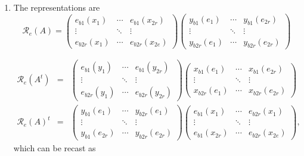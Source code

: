 \documentclass[aps,preprint]{revtex4}
\begin{document}
\begin{enumerate}
\item The representations are 
\begin{equation}
\mathcal{R}_{e}\left( A\right) =\left( 
\begin{array}{ccc}
e_{b1}\left( x_{1}\right) & \cdots & e_{b1}\left( x_{2r}\right) \\ 
\vdots & \ddots & \vdots \\ 
e_{b2r}\left( x_{1}\right) & \cdots & e_{b2r}\left( x_{2e}\right)%
\end{array}%
\right) \left( 
\begin{array}{ccc}
y_{b1}\left( e_{1}\right) & \cdots & y_{b1}\left( e_{2r}\right) \\ 
\vdots & \ddots & \vdots \\ 
y_{b2r}\left( e_{1}\right) & \cdots & y_{b2r}\left( e_{2r}\right)%
\end{array}%
\right)
\end{equation}

\begin{eqnarray}
\mathcal{R}_{e}\left( A^{t}\right) &=&\left( 
\begin{array}{ccc}
e_{b1}\left( y_{1}\right) & \cdots & e_{b1}\left( y_{2r}\right) \\ 
\vdots & \ddots & \vdots \\ 
e_{b2r}\left( y_{1}\right) & \cdots & e_{b2r}\left( y_{2r}\right)%
\end{array}%
\right) \left( 
\begin{array}{ccc}
x_{b1}\left( e_{1}\right) & \cdots & x_{b1}\left( e_{2r}\right) \\ 
\vdots & \ddots & \vdots \\ 
x_{b2r}\left( e_{1}\right) & \cdots & x_{b2r}\left( e_{2r}\right)%
\end{array}%
\right) \\
\mathcal{R}_{e}\left( A\right) ^{t} &=&\left( 
\begin{array}{ccc}
y_{b1}\left( e_{1}\right) & \cdots & y_{b2r}\left( e_{1}\right) \\ 
\vdots & \ddots & \vdots \\ 
y_{b1}\left( e_{2r}\right) & \cdots & y_{b2r}\left( e_{2r}\right)%
\end{array}%
\right) \left( 
\begin{array}{ccc}
e_{b1}\left( x_{1}\right) & \cdots & e_{b2r}\left( x_{1}\right) \\ 
\vdots & \ddots & \vdots \\ 
e_{b1}\left( x_{2r}\right) & \cdots & e_{b2r}\left( x_{2e}\right)%
\end{array}%
\right) ,
\end{eqnarray}%
which can be recast as


\end{enumerate}
\end{document}
